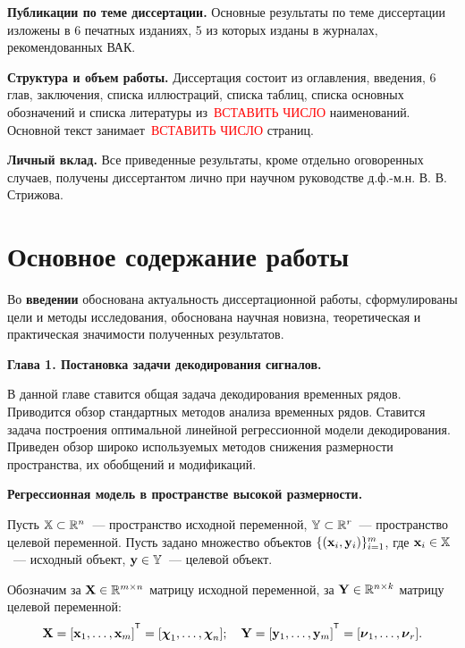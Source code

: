 \documentclass[11pt, a5paper]{dissert}
\begin{document}
\vspace{0.5cm}
\textbf{Публикации по теме диссертации.}
Основные результаты по теме диссертации изложены в 6 печатных изданиях, 5 из которых изданы в журналах, рекомендованных ВАК.

\vspace{0.5cm}
\textbf{Структура и объем работы.}
Диссертация состоит из оглавления, введения, 6 глав, заключения, списка иллюстраций, списка таблиц, списка основных обозначений и списка литературы из~\textcolor{red}{ВСТАВИТЬ ЧИСЛО} наименований. 
Основной текст занимает~\textcolor{red}{ВСТАВИТЬ ЧИСЛО} страниц.

\vspace{0.5cm}
\textbf{Личный вклад.}
Все приведенные результаты, кроме отдельно оговоренных случаев, получены диссертантом лично при научном руководстве д.ф.-м.н. В. В. Стрижова.

\section*{Основное содержание работы}

Во \textbf{введении} обоснована актуальность диссертационной работы, сформулированы цели и методы исследования, обоснована научная новизна, теоретическая и практическая значимости полученных результатов.

\textbf{Глава 1. Постановка задачи декодирования сигналов.}

В данной главе ставится общая задача декодирования временных рядов.
Приводится обзор стандартных методов анализа временных рядов.
Ставится задача построения оптимальной линейной регрессионной модели декодирования.
Приведен обзор широко используемых методов снижения размерности пространства, их обобщений и модификаций.

\textbf{Регрессионная модель в пространстве высокой размерности.}
\label{sec:ch1:reg_model}

Пусть $\mathbb{X} \subset \mathbb{R}^n$~--- пространство исходной переменной, $\mathbb{Y} \subset \mathbb{R}^r$~--- пространство целевой переменной.
Пусть задано множество объектов $\{(\mathbf{x}_i, \mathbf{y}_i)\}_{i=1}^m$, где $\mathbf{x}_i \in \mathbb{X}$~--- исходный объект, $\mathbf{y} \in \mathbb{Y}$~--- целевой объект.

Обозначим за $\mathbf{X} \in \mathbb{R}^{m \times n}$ матрицу исходной переменной, за $\mathbf{Y} \in \mathbb{R}^{n \times k}$ матрицу целевой переменной:
\begin{equation*}
	\bX = [\bx_1, \dots, \bx_m]^{\T} =  [\bchi_1, \dots, \bchi_n]; \quad \bY = [\by_1, \dots, \by_m]^{\T} =  [\bnu_1, \dots, \bnu_r].
\end{equation*}
\end{document}
